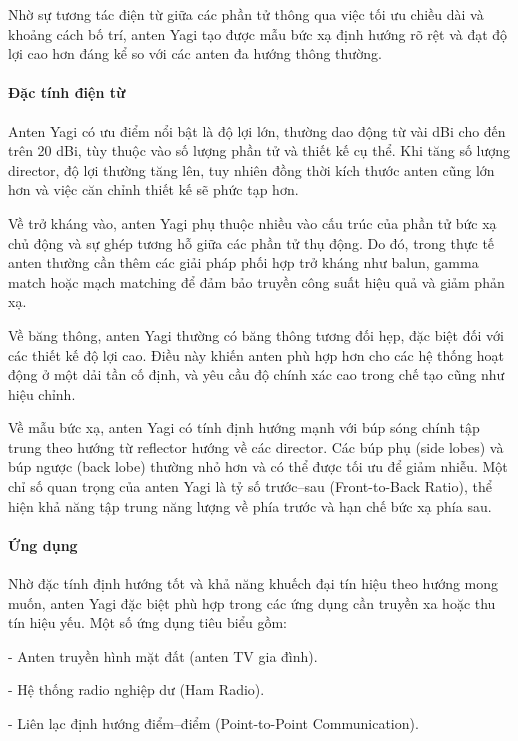 \documentclass{article}
\begin{document}
	Nhờ sự tương tác điện từ giữa các phần tử thông qua việc tối ưu chiều dài và khoảng cách bố trí, anten Yagi tạo được mẫu bức xạ định hướng rõ rệt và đạt độ lợi cao hơn đáng kể so với các anten đa hướng thông thường.
	
	\paragraph{Đặc tính điện từ}\mbox{}
	
	Anten Yagi có ưu điểm nổi bật là độ lợi lớn, thường dao động từ vài dBi cho đến trên 20 dBi, tùy thuộc vào số lượng phần tử và thiết kế cụ thể. Khi tăng số lượng director, độ lợi thường tăng lên, tuy nhiên đồng thời kích thước anten cũng lớn hơn và việc căn chỉnh thiết kế sẽ phức tạp hơn.
	
	Về trở kháng vào, anten Yagi phụ thuộc nhiều vào cấu trúc của phần tử bức xạ chủ động và sự ghép tương hỗ giữa các phần tử thụ động. Do đó, trong thực tế anten thường cần thêm các giải pháp phối hợp trở kháng như balun, gamma match hoặc mạch matching để đảm bảo truyền công suất hiệu quả và giảm phản xạ.
	
	Về băng thông, anten Yagi thường có băng thông tương đối hẹp, đặc biệt đối với các thiết kế độ lợi cao. Điều này khiến anten phù hợp hơn cho các hệ thống hoạt động ở một dải tần cố định, và yêu cầu độ chính xác cao trong chế tạo cũng như hiệu chỉnh.
	
	Về mẫu bức xạ, anten Yagi có tính định hướng mạnh với búp sóng chính tập trung theo hướng từ reflector hướng về các director. Các búp phụ (side lobes) và búp ngược (back lobe) thường nhỏ hơn và có thể được tối ưu để giảm nhiễu. Một chỉ số quan trọng của anten Yagi là tỷ số trước–sau (Front-to-Back Ratio), thể hiện khả năng tập trung năng lượng về phía trước và hạn chế bức xạ phía sau.
	
	\paragraph{Ứng dụng}\mbox{}
	
	Nhờ đặc tính định hướng tốt và khả năng khuếch đại tín hiệu theo hướng mong muốn, anten Yagi đặc biệt phù hợp trong các ứng dụng cần truyền xa hoặc thu tín hiệu yếu. Một số ứng dụng tiêu biểu gồm:
	
	- Anten truyền hình mặt đất (anten TV gia đình).
	
	- Hệ thống radio nghiệp dư (Ham Radio).
	
	- Liên lạc định hướng điểm–điểm (Point-to-Point Communication).
	
\end{document}
